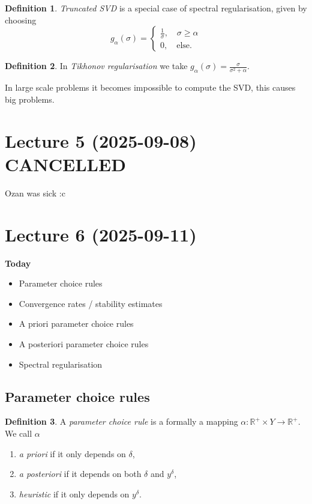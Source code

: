\documentclass[12pt]{article}
\theoremstyle{definition}
\newtheorem{definition}{Definition}[section]
\newcommand{\real}{\mathbb{R}}   %
\begin{document}
\begin{definition}
    \textit{Truncated SVD} is a special case of spectral regularisation, given by choosing \begin{equation*}
        g_\alpha(\sigma) = \begin{cases}
            \frac{1}{\sigma}, \quad \sigma\geq \alpha\\
            0, \quad \text{else}.
        \end{cases}
    \end{equation*}
\end{definition}

\begin{definition}
    In \textit{Tikhonov regularisation} we take $g_\alpha(\sigma) = \frac{\sigma}{\sigma^2 + \alpha}$.
\end{definition}

In large scale problems it becomes impossible to compute the SVD, this causes big problems.

\newpage

\section{Lecture 5 (2025-09-08) CANCELLED}
Ozan was sick :c

\newpage

\section{Lecture 6 (2025-09-11)}
\textbf{Today}
\begin{itemize}
    \item Parameter choice rules
    \item Convergence rates / stability estimates
    \item A priori parameter choice rules
    \item A posteriori parameter choice rules
    \item Spectral regularisation
\end{itemize}

\subsection{Parameter choice rules}
\begin{definition}
    A \textit{parameter choice rule} is a formally a mapping $\alpha:\real^+\times Y\to \real^+$. We call $\alpha$
    \begin{enumerate}[label =(\roman*)]
        \item \textit{a priori} if it only depends on $\delta$,
        \item \textit{a posteriori} if it depends on both $\delta$ and $y^\delta$,
        \item \textit{heuristic} if it only depends on $y^\delta$.
    \end{enumerate}
\end{definition}
\end{document}
